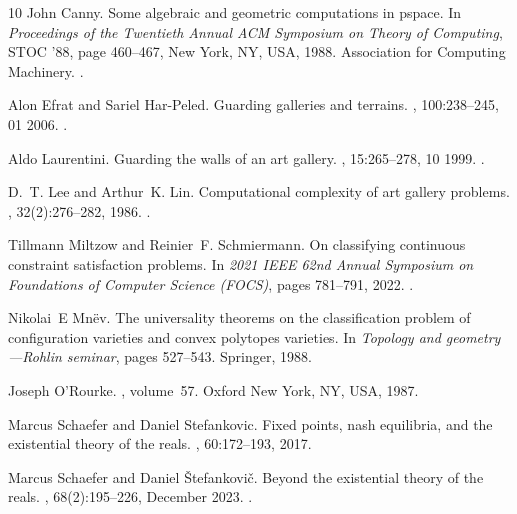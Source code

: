\documentclass[11pt]{article}
\theoremstyle{plain}
\theoremstyle{definition}
\numberwithin{theorem}{section}
\begin{document}
\begin{thebibliography}{10}
John Canny.
\newblock Some algebraic and geometric computations in pspace.
\newblock In {\em Proceedings of the Twentieth Annual ACM Symposium on Theory of Computing}, STOC '88, page 460–467, New York, NY, USA, 1988. Association for Computing Machinery.
\newblock \href {https://doi.org/10.1145/62212.62257} {}.

Alon Efrat and Sariel Har-Peled.
\newblock Guarding galleries and terrains.
, 100:238--245, 01 2006.
\newblock \href {https://doi.org/10.1007/978-0-387-35608-2_16} {}.

Aldo Laurentini.
\newblock Guarding the walls of an art gallery.
, 15:265--278, 10 1999.
\newblock \href {https://doi.org/10.1007/s003710050177} {}.

D.~T. Lee and Arthur~K. Lin.
\newblock Computational complexity of art gallery problems.
, 32(2):276--282, 1986.
\newblock \href {https://doi.org/10.1109/TIT.1986.1057165} {}.

Tillmann Miltzow and Reinier~F. Schmiermann.
\newblock On classifying continuous constraint satisfaction problems.
\newblock In {\em 2021 IEEE 62nd Annual Symposium on Foundations of Computer Science (FOCS)}, pages 781--791, 2022.
\newblock \href {https://doi.org/10.1109/FOCS52979.2021.00081} {}.

Nikolai~E Mn{\"e}v.
\newblock The universality theorems on the classification problem of configuration varieties and convex polytopes varieties.
\newblock In {\em Topology and geometry—Rohlin seminar}, pages 527--543. Springer, 1988.

Joseph O'Rourke.
, volume~57.
\newblock Oxford New York, NY, USA, 1987.

Marcus Schaefer and Daniel Stefankovic.
\newblock Fixed points, nash equilibria, and the existential theory of the reals.
, 60:172--193, 2017.

Marcus Schaefer and Daniel \v{S}tefankovi\v{c}.
\newblock Beyond the existential theory of the reals.
, 68(2):195–226, December 2023.
\newblock \href {https://doi.org/10.1007/s00224-023-10151-x} {}.


\end{thebibliography}
\end{document}
